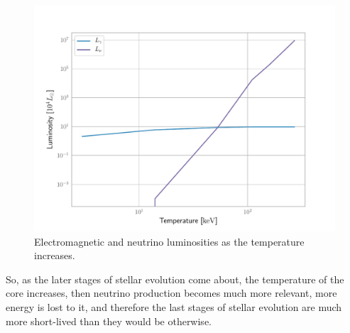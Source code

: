 \documentclass[main.tex]{subfiles}
\begin{document}
\begin{figure}[H]
\centering
\includegraphics[width=\textwidth]{figures/gamma_nu_luminosities.pdf}
\caption{Electromagnetic and neutrino luminosities as the temperature increases.}
\label{fig:gamma_nu_luminosities}
\end{figure}
    
So, as the later stages of stellar evolution come about, the temperature of the core increases, then neutrino production becomes much more relevant, more energy is lost to it, and therefore the last stages of stellar evolution are much more short-lived than they would be otherwise.
\end{document}
